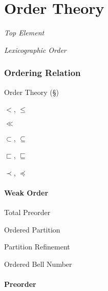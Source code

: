 \part{Order Theory}\label{sec:order_theory}


\emph{Top Element}

\emph{Lexicographic Order}



\section{Ordering Relation}\label{sec:ordering_relation}

Order Theory (\S\ref{sec:order_theory})

$<$, $\leq$

$\ll$

$\subset$, $\subseteq$

$\sqsubset$, $\sqsubseteq$

$\prec$, $\preceq$



\subsection{Weak Order}\label{sec:weak_order}

Total Preorder

Ordered Partition

Partition Refinement %

Ordered Bell Number



\subsection{Preorder}\label{sec:preorder}


